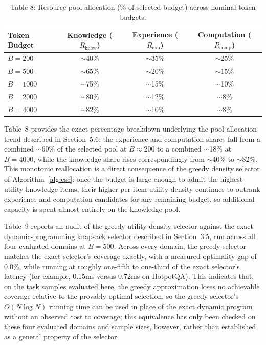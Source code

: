 \documentclass{article}
\begin{document}
\begin{table}[h]
\caption{Table 8: Resource pool allocation (\% of selected budget) across nominal token budgets.}
\centering
\begin{tabular}{lccc}
\toprule
Token Budget & Knowledge ($R_{\text{know}}$) & Experience ($R_{\text{exp}}$) & Computation ($R_{\text{comp}}$) \\
\midrule
$B = 200$ & $\sim$40\% & $\sim$35\% & $\sim$25\% \\
$B = 500$ & $\sim$65\% & $\sim$20\% & $\sim$15\% \\
$B = 1000$ & $\sim$75\% & $\sim$15\% & $\sim$10\% \\
$B = 2000$ & $\sim$80\% & $\sim$12\% & $\sim$8\% \\
$B = 4000$ & $\sim$82\% & $\sim$10\% & $\sim$8\% \\
\bottomrule
\end{tabular}
\end{table}

Table~8 provides the exact percentage breakdown underlying the pool-allocation trend described in Section~5.6: the experience and computation shares fall from a combined $\sim$60\% of the selected pool at $B\approx200$ to a combined $\sim$18\% at $B=4000$, while the knowledge share rises correspondingly from $\sim$40\% to $\sim$82\%. This monotonic reallocation is a direct consequence of the greedy density selector of Algorithm~\ref{alg:csc}: once the budget is large enough to admit the highest-utility knowledge items, their higher per-item utility density continues to outrank experience and computation candidates for any remaining budget, so additional capacity is spent almost entirely on the knowledge pool.

Table~9 reports an audit of the greedy utility-density selector against the exact dynamic-programming knapsack selector described in Section~3.5, run across all four evaluated domains at $B=500$. Across every domain, the greedy selector matches the exact selector's coverage exactly, with a measured optimality gap of 0.0\%, while running at roughly one-fifth to one-third of the exact selector's latency (for example, 0.15ms versus 0.72ms on HotpotQA). This indicates that, on the task samples evaluated here, the greedy approximation loses no achievable coverage relative to the provably optimal selection, so the greedy selector's $O(N \log N)$ running time can be used in place of the exact dynamic program without an observed cost to coverage; this equivalence has only been checked on these four evaluated domains and sample sizes, however, rather than established as a general property of the selector.
\end{document}
